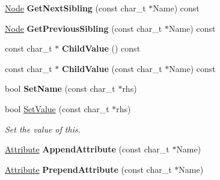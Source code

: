 \begin{DoxyCompactItemize}
\item 
\hypertarget{classphys_1_1xml_1_1Node_abd5e18e840cbfc2f8336c20782bec488}{
\hyperlink{classphys_1_1xml_1_1Node}{Node} {\bfseries GetNextSibling} (const char\_\-t $\ast$Name) const }
\label{d7/d0a/classphys_1_1xml_1_1Node_abd5e18e840cbfc2f8336c20782bec488}

\item 
\hypertarget{classphys_1_1xml_1_1Node_adaf337574156c86bbdb76264c5451c8d}{
\hyperlink{classphys_1_1xml_1_1Node}{Node} {\bfseries GetPreviousSibling} (const char\_\-t $\ast$Name) const }
\label{d7/d0a/classphys_1_1xml_1_1Node_adaf337574156c86bbdb76264c5451c8d}

\item 
\hypertarget{classphys_1_1xml_1_1Node_ac335f28f31104bf5ebf21b241b1b7fa0}{
const char\_\-t $\ast$ {\bfseries ChildValue} () const }
\label{d7/d0a/classphys_1_1xml_1_1Node_ac335f28f31104bf5ebf21b241b1b7fa0}

\item 
\hypertarget{classphys_1_1xml_1_1Node_a440dd1f325adc9fc95b038d1430b5fff}{
const char\_\-t $\ast$ {\bfseries ChildValue} (const char\_\-t $\ast$Name) const }
\label{d7/d0a/classphys_1_1xml_1_1Node_a440dd1f325adc9fc95b038d1430b5fff}

\item 
\hypertarget{classphys_1_1xml_1_1Node_ab686e72f297e120682e7278538fa7e66}{
bool {\bfseries SetName} (const char\_\-t $\ast$rhs)}
\label{d7/d0a/classphys_1_1xml_1_1Node_ab686e72f297e120682e7278538fa7e66}

\item 
bool \hyperlink{classphys_1_1xml_1_1Node_a50ff9948dac721339561ed3442fb7034}{SetValue} (const char\_\-t $\ast$rhs)
\begin{DoxyCompactList}\small\item\em Set the value of this. \item\end{DoxyCompactList}\item 
\hypertarget{classphys_1_1xml_1_1Node_a09ae0a1499b13de2db447fc95dd3b747}{
\hyperlink{classphys_1_1xml_1_1Attribute}{Attribute} {\bfseries AppendAttribute} (const char\_\-t $\ast$Name)}
\label{d7/d0a/classphys_1_1xml_1_1Node_a09ae0a1499b13de2db447fc95dd3b747}

\item 
\hypertarget{classphys_1_1xml_1_1Node_a6e28e9e0486eebd19dd90d19cc2f7a64}{
\hyperlink{classphys_1_1xml_1_1Attribute}{Attribute} {\bfseries PrependAttribute} (const char\_\-t $\ast$Name)}
\label{d7/d0a/classphys_1_1xml_1_1Node_a6e28e9e0486eebd19dd90d19cc2f7a64}


\end{DoxyCompactItemize}
